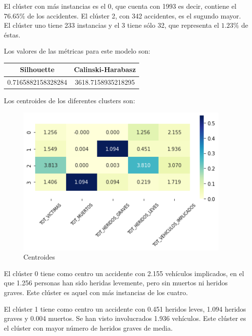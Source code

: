 \documentclass[a4]{article}
\begin{document}
\vspace{-3mm}

El clúster con más instancias es el 0, que cuenta con 1993 es decir, contiene el $76.65\%$ de los accidentes. El clúster 2, con 342 accidentes, es el sugundo mayor. El clúster uno tiene 233 instancias y el 3 tiene sólo 32, que representa el $1.23\%$ de éstas.

Los valores de las métricas para este modelo son:

\begin{center}
\begin{tabular}{|c|c|}
\hline
\multicolumn{1}{|c|}{\textbf{Silhouette}} & \textbf{Calinski-Harabasz}\\ \hline
  0.7165882158328284 & 3618.7158935218295  \\ \hline
\end{tabular}
\end{center}

Los centroides de los diferentes clusters son:

\vspace{-3mm}

\begin{figure}[H]
  \centering
  \caption{Centroides}
  \includegraphics[width=106mm]{imagenes/c3_kmeans_centroides}
\end{figure}

El clúster 0 tiene como centro un accidente con 2.155 vehículos implicados, en el que 1.256 personas han sido heridas levemente, pero sin muertos ni heridos graves. Este clúster es aquel con más instancias de los cuatro.

El clúster 1 tiene como centro un accidente con 0.451 heridos leves, 1.094 heridos graves y 0.004 muertos. Se han visto involucrados 1.936 vehículos. Este clúster es el clúster con mayor número de heridos graves de media.
\end{document}
